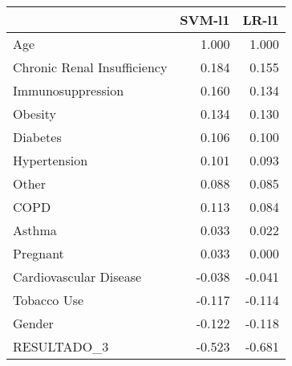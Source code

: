 \begin{tabular}{lrr}
\toprule
{} &  SVM-l1 &  LR-l1 \\
\midrule
Age                         &   1.000 &  1.000 \\
Chronic Renal Insufficiency &   0.184 &  0.155 \\
Immunosuppression           &   0.160 &  0.134 \\
Obesity                     &   0.134 &  0.130 \\
Diabetes                    &   0.106 &  0.100 \\
Hypertension                &   0.101 &  0.093 \\
Other                       &   0.088 &  0.085 \\
COPD                        &   0.113 &  0.084 \\
Asthma                      &   0.033 &  0.022 \\
Pregnant                    &   0.033 &  0.000 \\
Cardiovascular Disease      &  -0.038 & -0.041 \\
Tobacco Use                 &  -0.117 & -0.114 \\
Gender                      &  -0.122 & -0.118 \\
RESULTADO\_3                 &  -0.523 & -0.681 \\
\bottomrule
\end{tabular}
